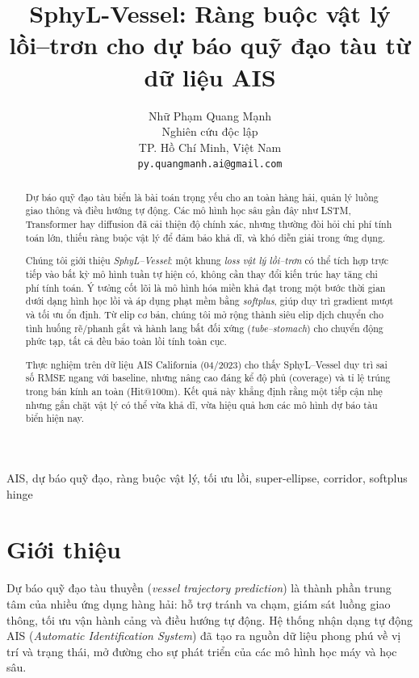 \documentclass{IEEEtran}
\title{SphyL-Vessel: Ràng buộc vật lý lồi--trơn cho dự báo quỹ đạo tàu từ dữ liệu AIS}
\author{
  Nhữ Phạm Quang Mạnh\\
  Nghiên cứu độc lập\\
  TP. Hồ Chí Minh, Việt Nam\\
  \texttt{py.quangmanh.ai@gmail.com}
}
\begin{document}
\maketitle

\begin{abstract}
Dự báo quỹ đạo tàu biển là bài toán trọng yếu cho an toàn hàng hải, quản lý luồng giao thông và điều hướng tự động. 
Các mô hình học sâu gần đây như LSTM, Transformer hay diffusion đã cải thiện độ chính xác, 
nhưng thường đòi hỏi chi phí tính toán lớn, thiếu ràng buộc vật lý để đảm bảo khả dĩ, 
và khó diễn giải trong ứng dụng. 

Chúng tôi giới thiệu \emph{SphyL--Vessel}: một khung \emph{loss vật lý lồi--trơn} có thể tích hợp trực tiếp vào bất kỳ mô hình tuần tự hiện có, 
không cần thay đổi kiến trúc hay tăng chi phí tính toán. 
Ý tưởng cốt lõi là mô hình hóa miền khả đạt trong một bước thời gian dưới dạng hình học lồi 
và áp dụng phạt mềm bằng \textit{softplus}, giúp duy trì gradient mượt và tối ưu ổn định. 
Từ elip cơ bản, chúng tôi mở rộng thành siêu elip dịch chuyển cho tình huống rẽ/phanh gắt 
và hành lang bất đối xứng (\emph{tube--stomach}) cho chuyển động phức tạp, 
tất cả đều bảo toàn lồi tính toàn cục. 

Thực nghiệm trên dữ liệu AIS California (04/2023) cho thấy SphyL--Vessel duy trì sai số RMSE ngang với baseline, 
nhưng nâng cao đáng kể độ phủ (coverage) và tỉ lệ trúng trong bán kính an toàn (Hit@100m). 
Kết quả này khẳng định rằng một tiếp cận nhẹ nhưng gắn chặt vật lý có thể vừa khả dĩ, 
vừa hiệu quả hơn các mô hình dự báo tàu biển hiện nay.
\end{abstract}


\begin{IEEEkeywords}
AIS, dự báo quỹ đạo, ràng buộc vật lý, tối ưu lồi, super-ellipse, corridor, softplus hinge
\end{IEEEkeywords}

\section{Giới thiệu}
Dự báo quỹ đạo tàu thuyền (\textit{vessel trajectory prediction}) là thành phần trung tâm của nhiều ứng dụng hàng hải: hỗ trợ tránh va chạm, giám sát luồng giao thông, tối ưu vận hành cảng và điều hướng tự động. 
Hệ thống nhận dạng tự động AIS (\textit{Automatic Identification System}) đã tạo ra nguồn dữ liệu phong phú về vị trí và trạng thái, mở đường cho sự phát triển của các mô hình học máy và học sâu.
\end{document}

